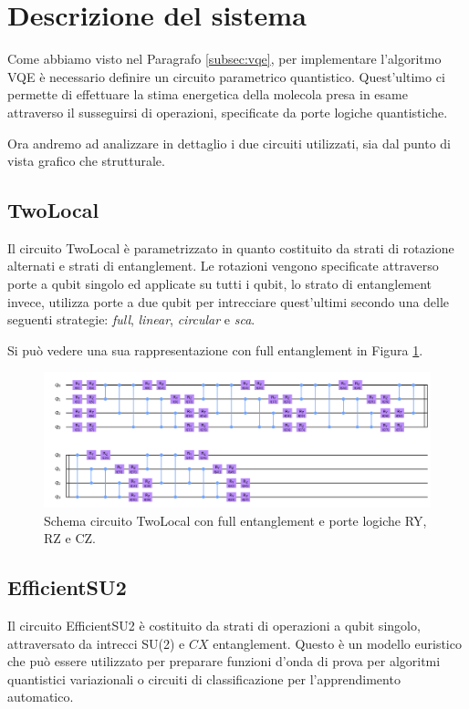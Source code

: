 \section{Descrizione del sistema}
Come abbiamo visto nel Paragrafo \ref{subsec:vqe}, per implementare l'algoritmo VQE è necessario definire un circuito parametrico quantistico.
Quest'ultimo ci permette di effettuare la stima energetica della molecola presa in esame attraverso il susseguirsi di operazioni, specificate da porte logiche quantistiche.

Ora andremo ad analizzare in dettaglio i due circuiti utilizzati, sia dal punto di vista grafico che strutturale.
\subsection{TwoLocal}
Il circuito TwoLocal è parametrizzato in quanto costituito da strati di rotazione alternati e strati di entanglement.
Le rotazioni vengono specificate attraverso porte a qubit singolo ed applicate su tutti i qubit, lo strato di entanglement invece, utilizza porte a due qubit per intrecciare quest'ultimi secondo una delle seguenti strategie: \textit{full}, \textit{linear}, \textit{circular} e \textit{sca}.

Si può vedere una sua rappresentazione con full entanglement in Figura \ref{fig:circuito_twolocal}.
\begin{figure}[htp]
    \centering
    \includegraphics[width=13cm]{Images/Capitolo3/circuito_twolocal.png}
    \caption[Schema circuito TwoLocal.]{Schema circuito TwoLocal con full entanglement e porte logiche RY, RZ e CZ.}
    \label{fig:circuito_twolocal}
\end{figure}

\subsection{EfficientSU2}
Il circuito EfficientSU2 è costituito da strati di operazioni a qubit singolo, attraversato da intrecci SU(2) e $CX$ entanglement.
Questo è un modello euristico che può essere utilizzato per preparare funzioni d'onda di prova per algoritmi quantistici variazionali o circuiti di classificazione per l'apprendimento automatico.

